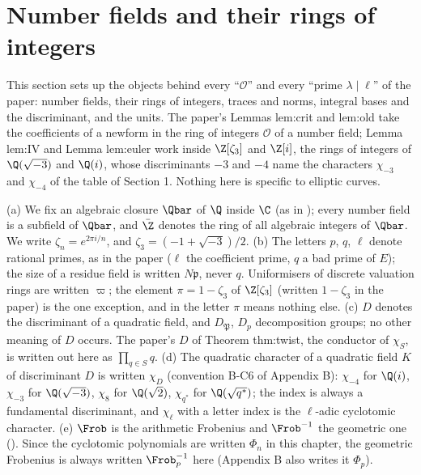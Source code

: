 \section{Number fields and their rings of integers}\label{sec:ant:integers}

This section sets up the objects behind every ``$\mathcal O$'' and every ``prime $\lambda\mid\ell$'' of the paper: number fields, their rings of
integers, traces and norms, integral bases and the discriminant, and the units. The paper's Lemmas lem:crit and lem:old take the
coefficients of a newform in the ring of integers $\mathcal O$ of a number field; Lemma lem:IV and Lemma lem:euler work inside
$\Z[\zeta_3]$ and $\Z[i]$, the rings of integers of $\Q(\sqrt{-3})$ and $\Q(i)$, whose discriminants $-3$ and $-4$ name the characters $\chi_{-3}$ and
$\chi_{-4}$ of the table of Section 1. Nothing here is specific to elliptic curves.

\begin{convention}\label{conv:ant:conventions}
(a) We fix an algebraic closure $\Qbar$ of $\Q$ inside $\C$ (as in ); every number field is a subfield of $\Qbar$, and $\bar\Z$
denotes the ring of all algebraic integers of $\Qbar$. We write $\zeta_n=e^{2\pi i/n}$, and $\zeta_3=(-1+\sqrt{-3})/2$.
(b) The letters $p$, $q$, $\ell$ denote rational primes, as in the paper ($\ell$ the coefficient prime, $q$ a bad prime of $E$); the size of a
residue field is written $N\mathfrak p$, never $q$. Uniformisers of discrete valuation rings are written $\varpi$; the element
$\pi=1-\zeta_3$ of $\Z[\zeta_3]$ (written $1-\zeta_3$ in the paper) is the one exception, and in  the letter $\pi$ means nothing else.
(c) $D$ denotes the discriminant of a quadratic field, and $D_{\mathfrak P}$, $D_p$ decomposition groups; no other meaning of $D$ occurs. The paper's $D$
of Theorem thm:twist, the conductor of $\chi_S$, is written out here as $\prod_{q\in S}q$.
(d) The quadratic character of a quadratic field $K$ of discriminant $D$ is written $\chi_D$ (convention B-C6 of
Appendix B): $\chi_{-4}$ for $\Q(i)$, $\chi_{-3}$ for $\Q(\sqrt{-3})$, $\chi_8$ for $\Q(\sqrt2)$, $\chi_{q^*}$ for $\Q(\sqrt{q^*})$; the index is
always a fundamental discriminant, and $\chi_\ell$ with a letter index is the $\ell$-adic cyclotomic character.
(e) $\Frob$ is the arithmetic Frobenius and $\Frob^{-1}$ the geometric one (). Since the cyclotomic polynomials are
written $\Phi_n$ in this chapter, the geometric Frobenius is always written $\Frob_p^{-1}$ here (Appendix B also writes it $\Phi_p$).
\end{convention}


